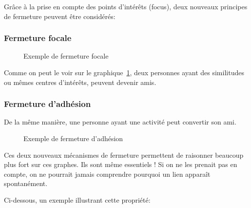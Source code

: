 Grâce à la prise en compte des points d'intérêts (focus), deux nouveaux principes de fermeture peuvent être considérés:

\subsubsection{Fermeture focale}
\begin{figure}[h!]
\centering
{}
\caption{Exemple de fermeture focale}

\label{graph:graphe3}
\end{figure}

Comme on peut le voir sur le graphique~\ref{graph:graphe3}, deux personnes ayant des similitudes ou mêmes centres d'intérêts, peuvent devenir amis.

\subsubsection{Fermeture d'adhésion}
De la même manière, une personne ayant une activité peut convertir son ami.
\begin{figure}[h!]
\centering
{}
\caption{Exemple de fermeture d'adhésion}
\label{graph:graphe4}
\end{figure}

Ces deux nouveaux mécanismes de fermeture permettent de raisonner beaucoup plus fort sur ces graphes. Ils sont même essentiels ! Si on ne les prenait pas en compte, on ne pourrait jamais comprendre pourquoi un lien apparaît spontanément.

\vspace{1ex}
Ci-dessous, un exemple illustrant cette propriété:

